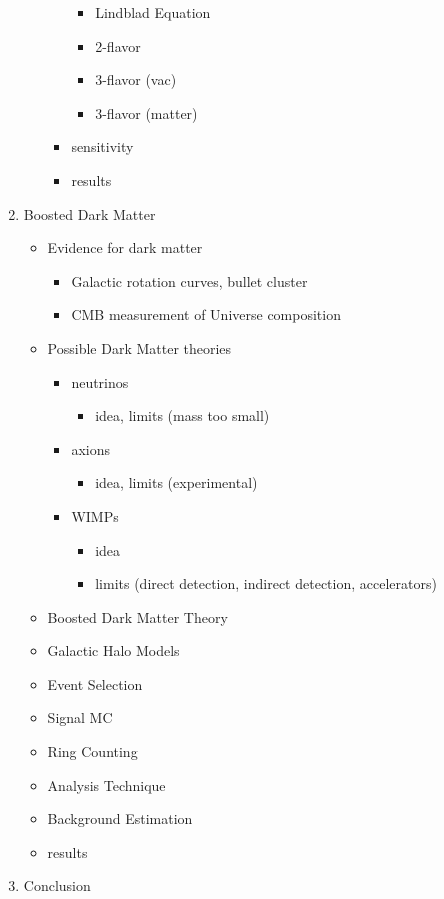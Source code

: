 \documentclass[12pt,oneside,openright]{article}
\begin{document}
\begin{enumerate}
\begin{itemize}
\begin{itemize}
			\begin{itemize}
			\item Lindblad Equation
			\item 2-flavor
			\item 3-flavor (vac)
			\item 3-flavor (matter)	
			\end{itemize}
		\item sensitivity
		\item results
		\end{itemize}
	\end{itemize} 
\item Boosted Dark Matter
	\begin{itemize}
	\item Evidence for dark matter
		\begin{itemize}
		\item Galactic rotation curves, bullet cluster
		\item CMB measurement of Universe composition	
		\end{itemize}
	\item Possible Dark Matter theories
		\begin{itemize}
		\item neutrinos
			\begin{itemize}					
			\item idea, limits (mass too small)
			\end{itemize}
		\item axions
			\begin{itemize}
			\item idea, limits (experimental)
			\end{itemize}
		\item WIMPs
			\begin{itemize}
			\item idea
			\item limits (direct detection, indirect detection, accelerators)
			\end{itemize}
		\end{itemize}
	\item Boosted Dark Matter Theory
	\item Galactic Halo Models
	\item Event Selection
	\item Signal MC
	\item Ring Counting
	\item Analysis Technique
	\item Background Estimation
	\item results
	\end{itemize}
\item Conclusion
\end{enumerate}
\end{document}
